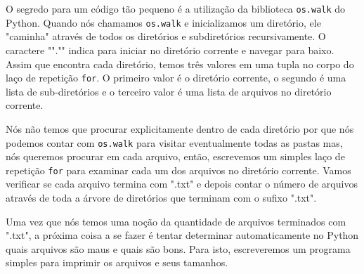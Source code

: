 O segredo para um código tão pequeno é a utilização da biblioteca {\tt os.walk} do Python. Quando nós chamamos
{\tt os.walk} e inicializamos um diretório, ele "caminha" através de todos os diretórios e subdiretórios recursivamente.
O caractere ""."" indica para iniciar no diretório corrente e navegar para baixo.
Assim que encontra cada diretório, temos três valores em uma tupla no corpo do laço de repetição {\tt for}.
O primeiro valor é o diretório corrente, o segundo é uma lista de sub-diretórios e o terceiro valor é uma lista de arquivos no diretório corrente.

Nós não temos que procurar explicitamente dentro de cada diretório por que nós podemos contar com {\tt os.walk} para visitar eventualmente todas as pastas mas, nós queremos procurar em cada arquivo, então, escrevemos um simples laço de repetição {\tt for} para examinar cada um dos arquivos no diretório corrente. Vamos verificar se cada arquivo termina com ".txt" e depois contar o número de arquivos através de toda a árvore de diretórios que terminam com o sufixo ".txt".

Uma vez que nós temos uma noção da quantidade de arquivos terminados com ".txt", a próxima coisa a se fazer é tentar determinar  automaticamente no Python quais arquivos são maus e quais são bons. Para isto, escreveremos um programa simples para imprimir os arquivos e seus tamanhos.

